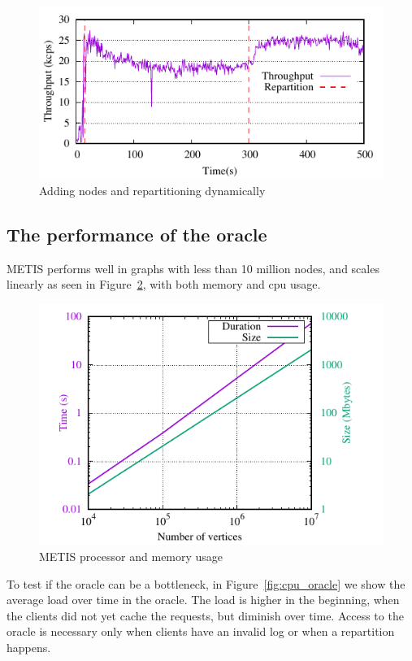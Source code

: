 \begin{figure}[ht]
	\includegraphics{figures/experiments/dynamicload-tp-move-4p}
	\caption{Adding nodes and repartitioning dynamically}
	\label{fig:dynamic_load_tput}
\end{figure}

\subsection{The performance of the oracle}

METIS performs well in graphs with less than 10 million nodes, and
scales linearly as seen in Figure~\ref{fig:metis_size_time}, with both
memory and cpu usage.

\begin{figure}[ht!]
  \centering
    \includegraphics[width=\columnwidth]{figures/metis_size_time}
	\caption{METIS processor and memory usage}
	\label{fig:metis_size_time}
\end{figure}

To test if the oracle can be a bottleneck, in
Figure~\ref{fig:cpu_oracle} we show the average load over time in the
oracle.  The load is higher in the beginning, when the clients did not
yet cache the requests, but diminish over time. Access to the oracle
is necessary only when clients have an invalid log or when a
repartition happens.

